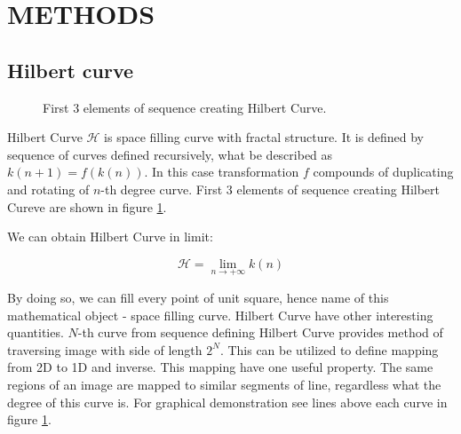 \documentclass[a4paper, 10 pt, journal]{ieeeconf}
\begin{document}
\section{METHODS}

\subsection{Hilbert curve}

\begin{figure}
	\centering
\caption{First 3 elements of sequence creating Hilbert Curve.}
	\label{fig:hilbert}
\end{figure}

Hilbert Curve $\mathcal{H}$ is space filling curve with fractal structure. It is defined by sequence of curves defined recursively, what be described as $k(n+1) = f(k(n))$. In this case transformation $f$ compounds of duplicating and rotating of $n$-th degree curve. First 3 elements of sequence creating Hilbert Cureve are shown in figure \ref{fig:hilbert}.

We can obtain Hilbert Curve in limit:

\begin{equation}
	\mathcal{H} = \lim_{n \rightarrow + \infty } k(n)
\end{equation}

By doing so, we can fill every point of unit square, hence name of this mathematical object - space filling curve. Hilbert Curve have other interesting quantities. $N$-th curve from sequence defining Hilbert Curve provides method of traversing image with side of length $2^{N}$. This can be utilized to define mapping from 2D to 1D and inverse. This mapping have one useful property. The same regions of an image are mapped to similar segments of line, regardless what the degree of this curve is. For graphical demonstration see lines above each curve in figure \ref{fig:hilbert}.
\end{document}
